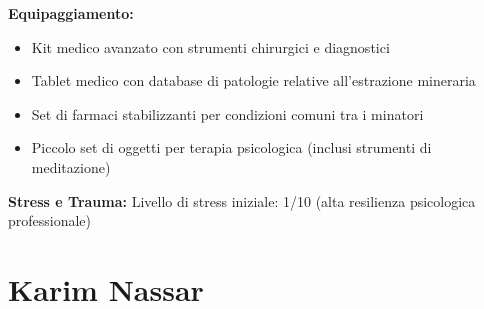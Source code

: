 \documentclass[11pt,a4paper]{article}
\begin{document}
\begin{tcolorbox}[colback=mininglightorange!20, colframe=miningorange]
\textbf{Equipaggiamento:}
\begin{itemize}[leftmargin=*]
\item Kit medico avanzato con strumenti chirurgici e diagnostici
\item Tablet medico con database di patologie relative all'estrazione mineraria
\item Set di farmaci stabilizzanti per condizioni comuni tra i minatori
\item Piccolo set di oggetti per terapia psicologica (inclusi strumenti di meditazione)
\end{itemize}

\textbf{Stress e Trauma:} Livello di stress iniziale: 1/10 (alta resilienza psicologica professionale)
\end{tcolorbox}

\section{Karim Nassar}
\end{document}
